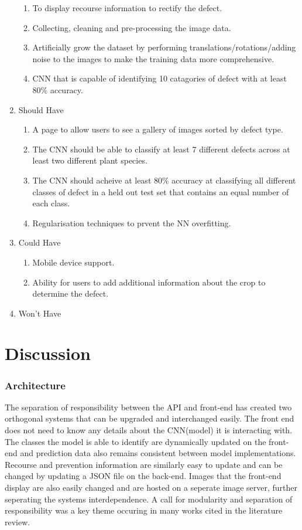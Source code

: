 \begin{enumerate}
\begin{enumerate}
      	\item To display recourse information to rectify the defect.\checkmark
      	\item Collecting, cleaning and pre-processing the image data. \checkmark
        \item Artificially grow the dataset by performing translations/rotations/adding noise to the images to make the training data more comprehensive.\checkmark
        \item CNN that is capable of identifying 10 catagories of defect with at least 80\% accuracy. \checkmark
      \end{enumerate}
      \item Should Have
      \begin{enumerate}
        \item A page to allow users to see a gallery of images sorted by
          defect type. \checkmark
        \item The CNN should be able to classify at least 7 different defects across at least two different plant species. \checkmark
        \item The CNN should acheive at least 80\% accuracy at classifying all different classes of defect in a held out test set that contains an equal number of each class. \checkmark
      	\item Regularisation techniques to prvent the NN overfitting. \checkmark
      \end{enumerate}
      \item Could Have
      \begin{enumerate}
          \item Mobile device support. \checkmark
        \item Ability for users to add additional information about the crop
          to determine the defect.
      \end{enumerate}
      \item Won't Have
    \end{enumerate}

\section{Discussion}
\subsubsection{Architecture}
  The separation of responsibility between the API and front-end has created two orthogonal systems that can be upgraded and interchanged easily. The front end does not need to know any details about the CNN(model) it is interacting with. The classes the model is able to identify are dynamically updated on the front-end and prediction data also remains consistent between model implementations. Recourse and prevention information are similarly easy to update and can be changed by updating a JSON file on the back-end. Images that the front-end display are also easily changed and are hosted on a seperate image server, further seperating the systems interdependence. A call for modularity and separation of responsibility was a key theme occuring in many works cited in the literature review.

